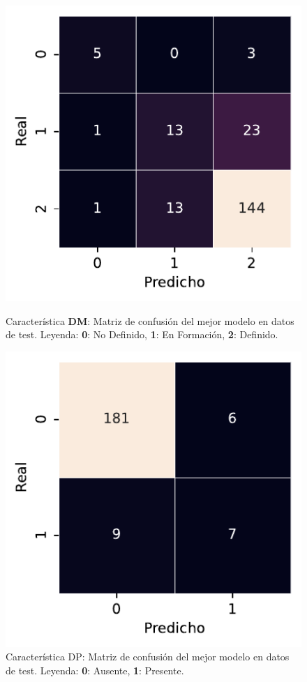 \begin{figure}[htbp]
    \includegraphics[width=0.4\linewidth]{figures/5_experiments/multi-dm-cm.pdf}
    \caption[Característica DM: Matriz de confusión del mejor modelo en datos de test.]{Característica \textbf{DM}: Matriz de confusión del mejor modelo en datos de test. Leyenda: \textbf{0}: No Definido, \textbf{1}: En Formación, \textbf{2}: Definido.}
    \label{fig5:DM_confusion_matrix}
    \includegraphics[width=0.4\linewidth]{figures/5_experiments/multi-dp-cm.pdf}
    \caption[Característica DP: Matriz de confusión del mejor modelo en datos de test.]{Característica DP: Matriz de confusión del mejor modelo en datos de test. Leyenda: \textbf{0}: Ausente, \textbf{1}: Presente.}
    \label{fig5:DP_confusion_matrix}
\end{figure}

